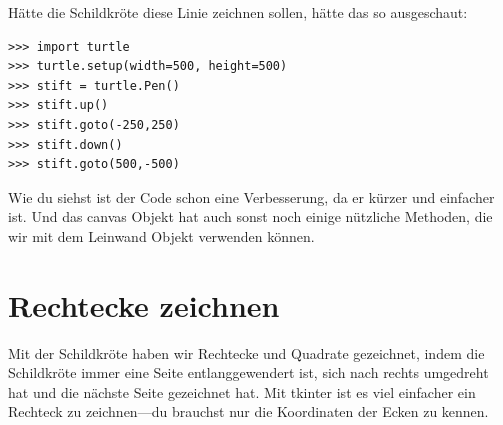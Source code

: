 \noindent
Hätte die Schildkröte diese Linie zeichnen sollen, hätte das so ausgeschaut:

\begin{Verbatim}[frame=single]
>>> import turtle
>>> turtle.setup(width=500, height=500)
>>> stift = turtle.Pen()
>>> stift.up()
>>> stift.goto(-250,250)
>>> stift.down()
>>> stift.goto(500,-500)
\end{Verbatim}

Wie du siehst ist der  Code schon eine Verbesserung, da er kürzer und einfacher ist. Und das canvas Objekt hat auch sonst noch einige nützliche Methoden, die wir mit dem Leinwand Objekt verwenden können.

\section{Rechtecke zeichnen}

Mit der Schildkröte haben wir Rechtecke und Quadrate gezeichnet, indem die Schildkröte immer eine Seite entlanggewendert ist, sich nach rechts umgedreht hat und die nächste Seite gezeichnet hat. Mit tkinter ist es viel einfacher ein Rechteck zu zeichnen---du brauchst nur die Koordinaten der Ecken zu kennen.


